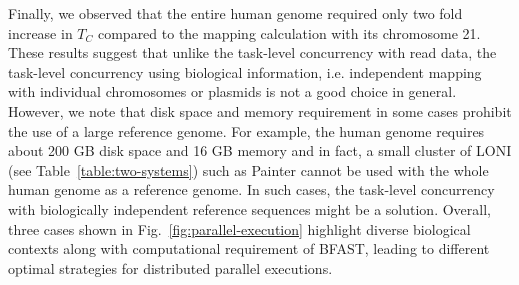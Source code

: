 \documentclass{sig-alternate}
\begin{document}
Finally, we observed that the entire human genome required only two fold increase in $T_C$ compared to the mapping calculation with its chromosome 21.  These results suggest that unlike the task-level concurrency with read data, the task-level concurrency using biological information, i.e. independent mapping with individual chromosomes or plasmids is not a good choice in general. However, we note that disk space and memory requirement in some cases prohibit the use of a large reference genome.  For example, the human genome requires about 200 GB disk space and 16 GB memory and in fact, a small cluster of LONI (see Table~\ref{table:two-systems}) such as Painter cannot be used with the whole human genome as a reference genome.   In such cases, the task-level concurrency with biologically independent reference sequences might be a solution.   Overall, three cases shown in
Fig.~\ref{fig:parallel-execution} highlight diverse biological
contexts along with computational requirement of BFAST, leading to different optimal strategies for distributed
parallel executions.





 
\end{document}
